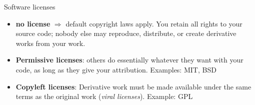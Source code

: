 \documentclass[compress]{beamer}
\begin{document}
\begin{frame}{Software licenses}
    \begin{itemize}
        \item<+-> {\bf no license} $\Rightarrow$ default copyright laws apply.
            You retain all rights to your source code; nobody else may
            reproduce, distribute, or create derivative works from your work.
        \item<+-> {\bf Permissive licenses}: others do essentially whatever they
            want with your code, as long as they give your attribution.
            Examples: MIT, BSD
        \item<+-> {\bf Copyleft licenses}: Derivative work must be made
            available under the same terms as the original work (\emph{viral
            licenses}). Example: GPL
    \end{itemize}


    \centering



\end{frame}
\end{document}
